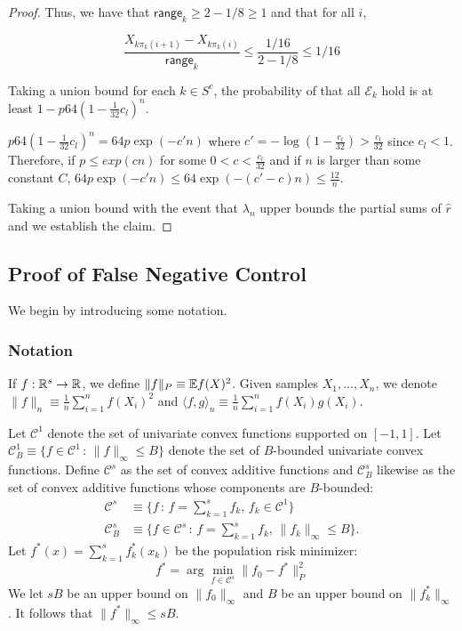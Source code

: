 \documentclass[12pt,pdftex,aos,noinfoline,addressasfootnote]{imsart}
\begin{document}
\begin{proof}
Thus, we have that $\mathsf{range}_k \geq 2 - 1/8 \geq 1$ and that for all $i$,

\[
\frac{X_{k\pi_k(i+1)} - X_{k \pi_k(i)}}{\mathsf{range}_k} \leq 
\frac{ 1/16 }{ 2 - 1/8} \leq 1/16
\]

Taking a union bound for each $k \in S^c$, the probability of that all $\mathcal{E}_k$ hold is at least $1 - p 64 \left( 1 - \frac{1}{32} c_l \right)^n$.

$p64 \left( 1 - \frac{1}{32} c_l \right)^n = 64 p \exp( - c' n)$ where $c' = -\log(1-\frac{c_l}{32}) > \frac{c_l}{32}$ since $c_l < 1$. Therefore, if $p \leq exp( c n)$ for some $0<c < \frac{c_l}{32}$ and if $n$ is larger than some constant $C$, $64 p \exp( - c' n) \leq 64 \exp( - (c' - c) n) \leq \frac{12}{n}$.

Taking a union bound with the event that $\lambda_n$ upper bounds the partial sums of $\hat{r}$ and we establish the claim. 

\end{proof}


  
 
 \subsection{Proof of False Negative Control}
 \label{sec:false_negative_proof}
 We begin by introducing some notation.
 \subsubsection{Notation} 
\label{sec:false_negative_proof_notations}
If $f : \mathbb{R}^s \rightarrow {\mathbb R}$, we define $\| f \|_P \equiv {\mathbb E} f(X)^2$. 
Given samples $X_1,...,X_n$, we denote $\| f \|_n \equiv \frac{1}{n} \sum_{i=1}^n f(X_i)^2$ and $\langle f, g \rangle_n \equiv \frac{1}{n} \sum_{i=1}^n f(X_i) g(X_i)$. 

Let $\mathcal{C}^1$ denote the set of univariate convex functions supported on $[-1,1]$. Let $\mathcal{C}^1_B \equiv \{ f \in \mathcal{C}^1 \,:\, \| f \|_\infty \leq B \}$ denote the set of $B$-bounded univariate convex functions. 
Define $\mathcal{C}^s$ as the set of convex additive functions and
$\mathcal{C}^s_B$ likewise as the set of convex additive functions
whose components are $B$-bounded:
\begin{align*}
\mathcal{C}^s &\equiv \{ f \,:\, f = \sum_{k=1}^s f_k, \,
   f_k \in \mathcal{C}^1 \} \\
\mathcal{C}^s_B &\equiv \{ f \in \mathcal{C}^s \,:\, 
f = \sum_{k=1}^s f_k, \, \| f_k \|_\infty \leq B \}.
\end{align*}
Let $f^*(x) = \sum_{k=1}^s f^*_k(x_k)$ be the population risk minimizer:
\[
f^* = \arg\min_{f \in \mathcal{C}^s} \| f_0 - f^* \|_P^2
\]
We let $sB$ be an upper bound on $\| f_0 \|_\infty$ and $B$ be an
upper bound on $\| f^*_k \|_\infty$. 
It follows that $\|f^* \|_\infty \leq s B$.
\end{document}
